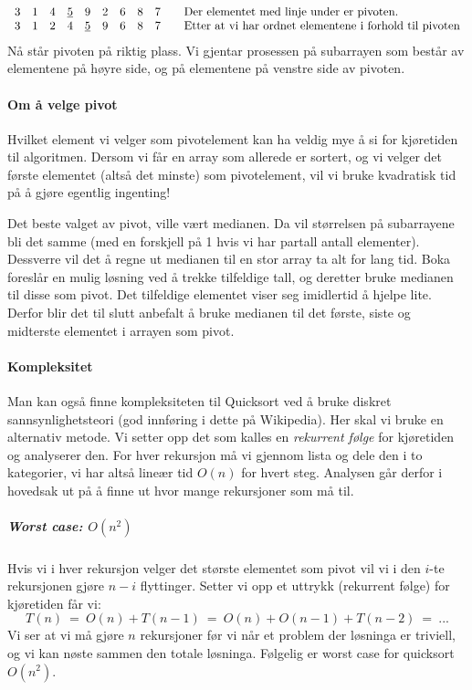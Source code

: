 \begin{eks} ~\newline
\[
  \begin{array}{c c c c c c c c c l}
    3&1&4&\underline{5}&9&2&6&8&7 &\quad \text{Der elementet med linje under er pivoten.}\\
    3&1&2&4&\underline{5}&9&6&8&7 &\quad \text{Etter at vi har ordnet elementene
    i forhold til pivoten}
  \end{array}
\]
Nå står pivoten på riktig plass. Vi gjentar prosessen på subarrayen som består
av elementene på høyre side, og på elementene på venstre side av pivoten.
\end{eks}

\paragraph{Om å velge pivot}
Hvilket element vi velger som pivotelement kan ha veldig mye å si for kjøretiden
til algoritmen. Dersom vi får en array som allerede er sortert, og vi velger det
første elementet (altså det minste) som pivotelement, vil vi bruke kvadratisk
tid på å gjøre egentlig ingenting!

Det beste valget av pivot, ville vært medianen. Da vil størrelsen på
subarrayene bli det samme (med en forskjell på 1 hvis vi har partall antall
elementer). Dessverre vil det å regne ut medianen til en stor array ta alt for
lang tid. Boka foreslår en mulig løsning ved å trekke tilfeldige tall, og
deretter bruke medianen til disse som pivot. Det tilfeldige elementet viser seg
imidlertid å hjelpe lite. Derfor blir det til slutt anbefalt å bruke medianen
til det første, siste og midterste elementet i arrayen som pivot.


\paragraph{Kompleksitet}
Man kan også finne kompleksiteten til Quicksort ved å bruke diskret sannsynlighetsteori (god innføring i dette på Wikipedia). Her skal vi bruke en alternativ metode. Vi setter opp det som kalles en \emph{rekurrent følge} for kjøretiden og analyserer den. For hver rekursjon må vi gjennom lista og dele den i to kategorier, vi har altså lineær tid $ O(n) $ for hvert steg. Analysen går derfor i hovedsak ut på å finne ut hvor mange rekursjoner som må til. 

\subparagraph{Worst case: $ O(n^2) $}
Hvis vi i hver rekursjon velger det største elementet som pivot vil vi i den $ i $-te rekursjonen gjøre $ n-i $ flyttinger. Setter vi opp et uttrykk (rekurrent følge) for kjøretiden får vi:
\[ T(n) ~=~ O(n) + T(n-1) ~=~ O(n) + O(n-1) + T(n-2) ~=~ ... \]
Vi ser at vi må gjøre $ n $ rekursjoner før vi når et problem der løsninga er triviell, og vi kan nøste sammen den totale løsninga. Følgelig er worst case for quicksort $ O(n^2) $.

